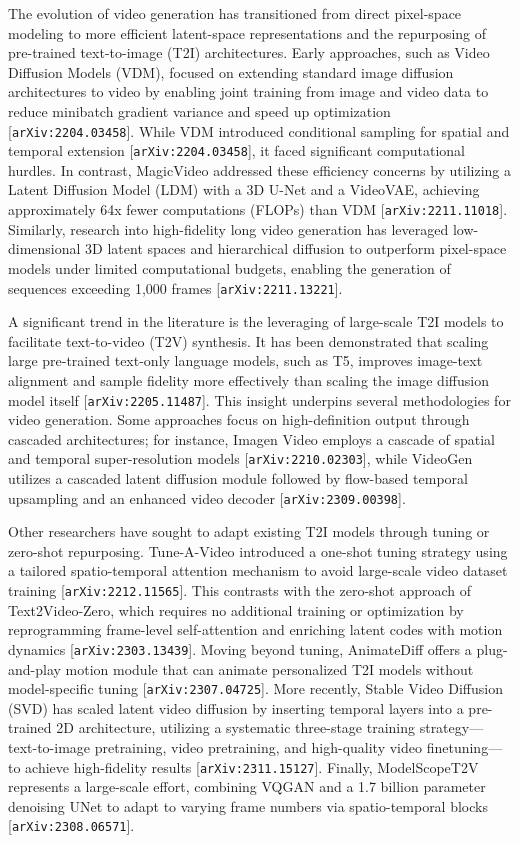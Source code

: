 \documentclass[11pt]{article}
\begin{document}
The evolution of video generation has transitioned from direct pixel-space modeling to more efficient latent-space representations and the repurposing of pre-trained text-to-image (T2I) architectures. Early approaches, such as Video Diffusion Models (VDM), focused on extending standard image diffusion architectures to video by enabling joint training from image and video data to reduce minibatch gradient variance and speed up optimization [\texttt{arXiv:2204.03458}]. While VDM introduced conditional sampling for spatial and temporal extension [\texttt{arXiv:2204.03458}], it faced significant computational hurdles. In contrast, MagicVideo addressed these efficiency concerns by utilizing a Latent Diffusion Model (LDM) with a 3D U-Net and a VideoVAE, achieving approximately 64x fewer computations (FLOPs) than VDM [\texttt{arXiv:2211.11018}]. Similarly, research into high-fidelity long video generation has leveraged low-dimensional 3D latent spaces and hierarchical diffusion to outperform pixel-space models under limited computational budgets, enabling the generation of sequences exceeding 1,000 frames [\texttt{arXiv:2211.13221}].

A significant trend in the literature is the leveraging of large-scale T2I models to facilitate text-to-video (T2V) synthesis. It has been demonstrated that scaling large pre-trained text-only language models, such as T5, improves image-text alignment and sample fidelity more effectively than scaling the image diffusion model itself [\texttt{arXiv:2205.11487}]. This insight underpins several methodologies for video generation. Some approaches focus on high-definition output through cascaded architectures; for instance, Imagen Video employs a cascade of spatial and temporal super-resolution models [\texttt{arXiv:2210.02303}], while VideoGen utilizes a cascaded latent diffusion module followed by flow-based temporal upsampling and an enhanced video decoder [\texttt{arXiv:2309.00398}].

Other researchers have sought to adapt existing T2I models through tuning or zero-shot repurposing. Tune-A-Video introduced a one-shot tuning strategy using a tailored spatio-temporal attention mechanism to avoid large-scale video dataset training [\texttt{arXiv:2212.11565}]. This contrasts with the zero-shot approach of Text2Video-Zero, which requires no additional training or optimization by reprogramming frame-level self-attention and enriching latent codes with motion dynamics [\texttt{arXiv:2303.13439}]. Moving beyond tuning, AnimateDiff offers a plug-and-play motion module that can animate personalized T2I models without model-specific tuning [\texttt{arXiv:2307.04725}]. More recently, Stable Video Diffusion (SVD) has scaled latent video diffusion by inserting temporal layers into a pre-trained 2D architecture, utilizing a systematic three-stage training strategy—text-to-image pretraining, video pretraining, and high-quality video finetuning—to achieve high-fidelity results [\texttt{arXiv:2311.15127}]. Finally, ModelScopeT2V represents a large-scale effort, combining VQGAN and a 1.7 billion parameter denoising UNet to adapt to varying frame numbers via spatio-temporal blocks [\texttt{arXiv:2308.06571}].
\end{document}
